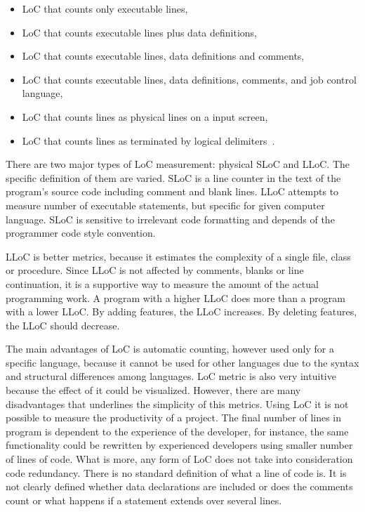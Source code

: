 \begin{itemize}
\item \ac{LoC} that counts only executable lines,
\item \ac{LoC} that counts executable lines plus data definitions,
\item \ac{LoC} that counts executable lines, data definitions and comments,
\item \ac{LoC} that counts executable lines, data definitions, comments, and job control language,
\item \ac{LoC} that counts lines as physical lines on a input screen,
\item \ac{LoC} that counts lines as terminated by logical delimiters~\cite{metrics}.
\end{itemize}

There are two major types of  \ac{LoC} measurement: physical \ac{SLoC} and \ac{LLoC}. The specific definition of them are varied. \ac{SLoC} is a line counter in the text of the program's source code including comment and blank lines. \ac{LLoC} attempts to measure number of executable statements, but specific for given computer language. \ac{SLoC} is sensitive to irrelevant code formatting and depends of the programmer code style convention. 

\ac{LLoC} is better metrics, because it estimates the complexity of a single file, class or procedure. Since \ac{LLoC} is not affected by comments, blanks or line continuation, it is a supportive way to measure the amount of the actual programming work. A program with a higher \ac{LLoC} does more than a program with a lower \ac{LLoC}. By adding features, the \ac{LLoC} increases. By deleting features, the \ac{LLoC} should decrease. 

The main advantages of \ac{LoC} is automatic counting,  however used only for a specific language, because it cannot be used for other languages due to the syntax and structural differences among languages.  \ac{LoC} metric is also very intuitive because the effect of it could be visualized. However, there are many disadvantages that underlines the simplicity of this metrics. Using \ac{LoC} it is not possible to measure the productivity of a project. The final number of lines in program is dependent to the experience of the developer,  for instance, the same functionality could be rewritten by experienced developers using smaller number of lines of code. What is more, any form of \ac{LoC} does not take into consideration code redundancy.  There is no standard definition of what a line of code is. It is not clearly defined whether data declarations are included or  does the comments count or  what happens if a statement extends over several lines. 

